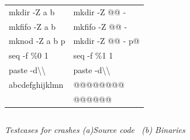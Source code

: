 \begin{figure}[t]
{

{

\begin{minipage}{.24\linewidth}
{
\begin{scriptsize}
\begin{tabular}{|l|l|} %
\hline
{mkdir -Z a b}&{mkdir -Z @@ -}\\ 
{mkfifo -Z a b}&{mkfifo -Z @@ -}\\ 
{mknod -Z a b p}&{mkdir -Z @@ - p@}\\ 
{seq -f \%0 1}&{seq -f \%1 1}\\ 
{paste -d\textbackslash \textbackslash   }&{paste -d\textbackslash \textbackslash   }\\ 
{\hspace{1ex}abcdefghijklmn}&{\hspace{1ex}@@@@@@@@ }\\ 
{}&{\hspace{1ex}@@@@@@ }\\  \hline
\end{tabular}
\caption {{\textit{Testcases for crashes (a)Source code~\cite{Cadar-KLEE} (b) Binaries }}}
\label{fig:result-symExec-testCases}
\end{scriptsize}%
}
\end{minipage}
\hfill
\hspace{1ex}
\begin{minipage}{.21\linewidth}
\centering
{
\begin{scriptsize}
\begin{tabular}{|l|l|l|} %

\end{tabular}
\end{scriptsize}}
\end{minipage}}}
\end{figure}
